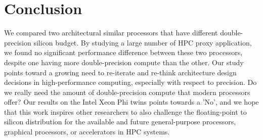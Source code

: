 \section{Conclusion}\label{sec:conclusion}
%
\begin{comment}

\struc{what did we learn which can be beneficial for others in the HPC community}

\struc{what is our recommendation for vendors and centers buying new systems}

\struc{praise our github w/ link so that others can perform similar stuff and
check, study, validate our results, also link to our TR or extended version
with appendix of less interesting results, etc.}
\end{comment}

We compared two architectural similar processors that have different double-precision
silicon budget. By studying a large number of HPC proxy application, we found no significant 
performance difference between these two processors, despite one having more double-precision
compute than the other. Our study points toward a growing need to re-iterate and re-think
architecture design decisions in high-performance computing, especially with respect
to precision. 
Do we really need the amount of double-precision compute that modern processors offer?
Our results on the Intel Xeon Phi twins points towards a 'No', and we hope that this
work inspires other researchers to also challenge the floating-point to silicon distribution
for the available and future general-purpose processors, graphical processors, or
accelerators in HPC systems.
